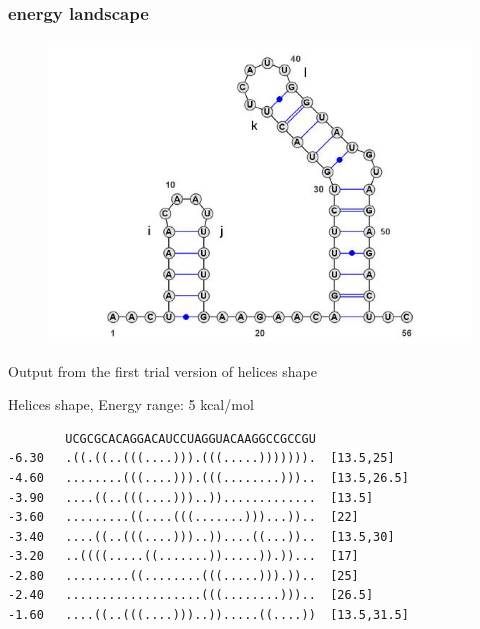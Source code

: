 \documentclass[ignorenonframetext,10pt]{beamer}
\begin{document}
\begin{frame}
\frametitle{energy landscape}  
\begin{figure}
  \includegraphics[scale=0.4]{images/helices_position.jpg} 
\end{figure}
\end{frame}

\begin{frame}[fragile]
  Output from the first trial version of helices shape
  \begin{block}{\small Helices shape, Energy range: 5 kcal/mol}
  \begin{verbatim}
        UCGCGCACAGGACAUCCUAGGUACAAGGCCGCCGU
-6.30   .((.((..(((....))).(((.....))))))).  [13.5,25]  
-4.60   ........(((....))).(((........)))..  [13.5,26.5] 
-3.90   ....((..(((....)))..)).............  [13.5]
-3.60   .........((....(((.......)))...))..  [22]
-3.40   ....((..(((....)))..))....((...))..  [13.5,30]
-3.20   ..((((.....((.......)).....)).))...  [17]
-2.80   .........((........(((.....))).))..  [25]
-2.40   ...................(((........)))..  [26.5]
-1.60   ....((..(((....)))..)).....((....))  [13.5,31.5]
  \end{verbatim} 
  \end{block}
\end{frame}
\end{document}
